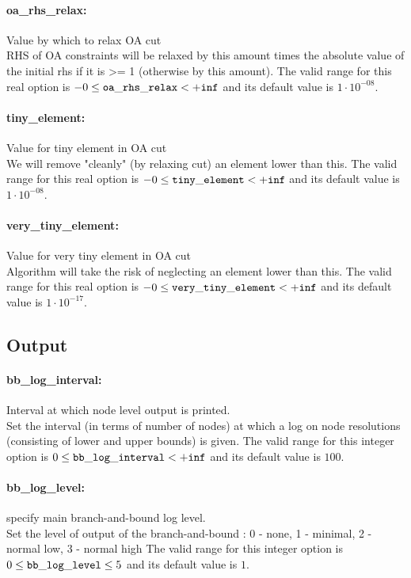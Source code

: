\paragraph{oa\_rhs\_relax:}\label{opt:oa_rhs_relax} Value by which to relax OA cut \\
 RHS of OA constraints will be relaxed by this amount times the absolute value of the initial rhs if it is >= 1 (otherwise by this amount). The valid range for this real option is 
$-0 \le {\tt oa\_rhs\_relax } <  {\tt +inf}$
and its default value is $1 \cdot 10^{-08}$.


\paragraph{tiny\_element:}\label{opt:tiny_element} Value for tiny element in OA cut \\
 We will remove "cleanly" (by relaxing cut) an element lower than this. The valid range for this real option is 
$-0 \le {\tt tiny\_element } <  {\tt +inf}$
and its default value is $1 \cdot 10^{-08}$.


\paragraph{very\_tiny\_element:}\label{opt:very_tiny_element} Value for very tiny element in OA cut \\
 Algorithm will take the risk of neglecting an element lower than this. The valid range for this real option is 
$-0 \le {\tt very\_tiny\_element } <  {\tt +inf}$
and its default value is $1 \cdot 10^{-17}$.


\subsection{Output}
\label{sec:Output}
\paragraph{bb\_log\_interval:}\label{opt:bb_log_interval} Interval at which node level output is printed. \\
 Set the interval (in terms of number of nodes) at which a log on node resolutions (consisting of lower and upper bounds) is given. The valid range for this integer option is
$0 \le {\tt bb\_log\_interval } <  {\tt +inf}$
and its default value is $100$.


\paragraph{bb\_log\_level:}\label{opt:bb_log_level} specify main branch-and-bound log level. \\
 Set the level of output of the branch-and-bound : 0 - none, 1 - minimal, 2 - normal low, 3 - normal high The valid range for this integer option is
$0 \le {\tt bb\_log\_level } \le 5$
and its default value is $1$.


